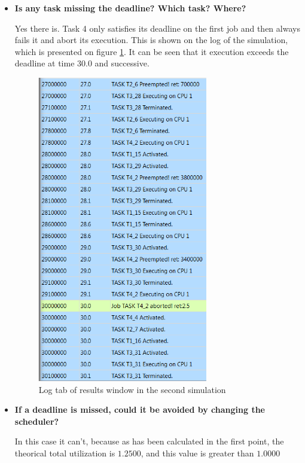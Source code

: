 \documentclass[12pt]{article}
\begin{document}
\begin{itemize}
\item \textbf{Is any task missing the deadline? Which task? Where?}

Yes there is. Task 4 only satisfies its deadline on the first job and then always fails it and abort its execution. This is shown on the log of the simulation, which is presented on figure \ref{blogtab}. It can be seen that it execution exceeds the deadline at time 30.0 and successive.

\begin{figure}[h]
\centering
\includegraphics[width=0.7\textwidth]{figures/B_log}   
\caption{Log tab of results window in the second simulation}
\label{blogtab}
\end{figure}
\FloatBarrier

\item \textbf{If a deadline is missed, could it be avoided by changing the scheduler?}

In this case it can't, because as has been calculated in the first point, the theorical total utilization is $1.2500$, and this value is greater than $1.0000$

\end{itemize}
    
        
\end{document}
